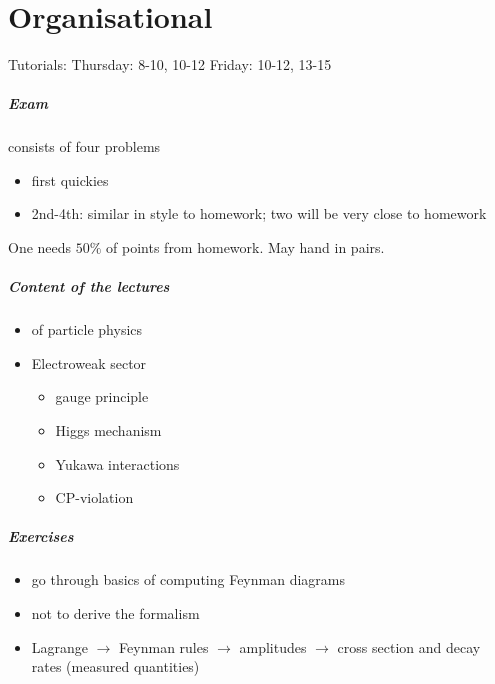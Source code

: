 \setcounter{chapter}{-1}
\chapter{Organisational}
Tutorials:
Thursday:   8-10, 10-12
Friday:     10-12, 13-15 

\paragraph{Exam} consists of four problems
\begin{itemize}
   \item first quickies
   \item 2nd-4th: similar in style to homework; two will be very close to homework 
\end{itemize}
One needs $50\%$ of points from homework. May hand in pairs.

\paragraph{Content of the lectures}
\begin{itemize}
   \item \sm of particle physics
   \item Electroweak sector
      \begin{itemize}
         \item gauge principle
         \item Higgs mechanism
         \item Yukawa interactions
         \item CP-violation
      \end{itemize}
\end{itemize}

\paragraph{Exercises}
\begin{itemize}
   \item go through basics of computing Feynman diagrams
   \item not to derive the formalism
   \item Lagrange $\rightarrow$ Feynman rules $\rightarrow$ amplitudes $\rightarrow$ cross section and decay rates (measured quantities)
\end{itemize}

